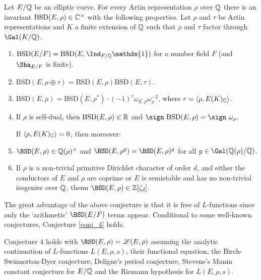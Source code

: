 \begin{conj}\cite[Conjecture 4]{DEW1}\label{conj_4}
    Let $E/\mathbb{Q}$ be an elliptic curve. For every Artin representation $\rho$ over $\mathbb{Q}$ there is an invariant $\mathrm{BSD}(E,\rho)\in\mathbb{C}^{\times}$ with the following properties. Let $\rho$ and $\tau$ be Artin representations and $K$ a finite extension of $\mathbb{Q}$ such that $\rho$ and $\tau$ factor through $\Gal(K/\QQ)$.
    \begin{enumerate}[label={\bfseries C\arabic*.}]
        \item $\mathrm{BSD}(E/F)=\mathrm{BSD}(E,\Ind_{F/\QQ}\mathds{1})$ for a number field $F$ (and $\Sha_{E/F}$ is finite).
        \item $\mathrm{BSD}(E,\rho\oplus\tau)=\mathrm{BSD}(E,\rho)\mathrm{BSD}(E,\tau)$.
        \item $\mathrm{BSD}(E,\rho)=\mathrm{BSD}(E,\rho^*)\cdot(-1)^{r}\omega_{E,\rho}\omega_\rho^{-2}$, where $r=\langle\rho,E(K)_{\mathbb{C}}\rangle$.
        \item If $\rho$ is self-dual, then $\mathrm{BSD}(E,\rho)\in\mathbb{R}$ and $\sign\ \mathrm{BSD}(E,\rho)=\sign\ \omega_\rho$.
        
        If $\langle\rho,E(K)_{\mathbb{C}}\rangle=0$, then moreover:
        \item $\BSD(E,\rho)\in\QQ(\rho)^{\times}$ and $\BSD(E,\rho^g)=\BSD(E,\rho)^g$ for all $g\in\Gal(\QQ(\rho)/\QQ)$.
        \item If $\rho$ is a non-trivial primitive Dirichlet character of order $d$, and either the conductors of $E$ and $\rho$ are coprime or $E$ is semistable and has no non-trivial isogenies over $\mathbb{Q}$, thenn $\BSD(E,\rho)\in\ZZ[\zeta_d]$. 
    \end{enumerate}
\end{conj}

The great advantage of the above conjecture is that it is free of $L$-functions since only the `arithmetic' $\BSD(E/F)$ terms appear. Conditional to some well-known conjectures, Conjecture \ref{conj_4} holds.

\begin{thm} \cite[Theorem 5]{DEW1}
    Conjecture $4$ holds with $\BSD(E,\rho)=\mathcal{L}(E,\rho)$ assuming the analytic continuation of $L$-functions $L(E,\rho,s)$, their functional equation, the Birch-Swinnerton-Dyer conjecture,
    Deligne's period conjecture, Stevens's Manin constant conjecture for $E/\mathbb{Q}$ and the Riemann
    hypothesis for $L(E,\rho,s)$.
\end{thm}


